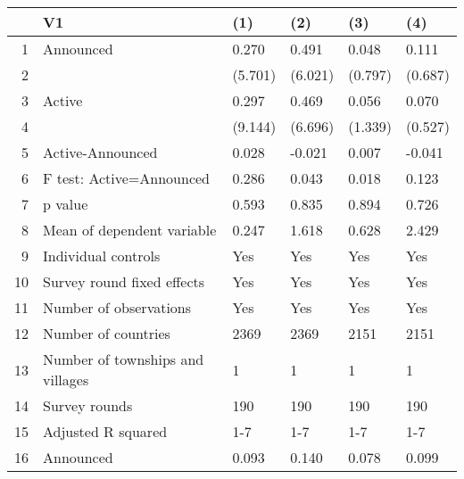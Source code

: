 \begin{table}[ht]
\centering
\begin{tabular}{rlllll}
  \hline
 & V1 & (1) & (2) & (3) & (4) \\ 
  \hline
1 & Announced & 0.270 & 0.491 & 0.048 & 0.111 \\ 
  2 &  & (5.701) & (6.021) & (0.797) & (0.687) \\ 
  3 & Active & 0.297 & 0.469 & 0.056 & 0.070 \\ 
  4 &  & (9.144) & (6.696) & (1.339) & (0.527) \\ 
  5 & Active-Announced & 0.028 & -0.021 & 0.007 & -0.041 \\ 
  6 & F test: Active=Announced & 0.286 & 0.043 & 0.018 & 0.123 \\ 
  7 & p value & 0.593 & 0.835 & 0.894 & 0.726 \\ 
  8 & Mean of dependent variable & 0.247 & 1.618 & 0.628 & 2.429 \\ 
  9 & Individual controls & Yes & Yes & Yes & Yes \\ 
  10 & Survey round fixed effects & Yes & Yes & Yes & Yes \\ 
  11 & Number of observations & Yes & Yes & Yes & Yes \\ 
  12 & Number of countries & 2369 & 2369 & 2151 & 2151 \\ 
  13 & Number of townships and villages & 1 & 1 & 1 & 1 \\ 
  14 & Survey rounds & 190 & 190 & 190 & 190 \\ 
  15 & Adjusted R squared & 1-7 & 1-7 & 1-7 & 1-7 \\ 
  16 & Announced & 0.093 & 0.140 & 0.078 & 0.099 \\ 
   \hline
\end{tabular}
\end{table}
